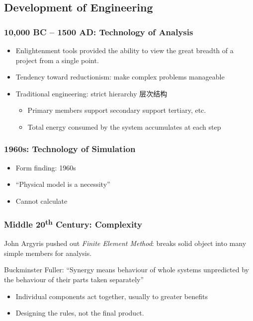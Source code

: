 \documentclass[a4paper, openany]{book}
\begin{document}
\subsection{Development of Engineering}

\subsubsection{10,000 BC -- 1500 AD: Technology of Analysis}

\begin{itemize}
  \item Enlightenment tools provided the ability to view the great breadth of a project from a single point.
  \item Tendency toward reductionism: make complex problems manageable
  \item Traditional engineering: strict hierarchy 层次结构
  \begin{itemize}
    \item Primary members support secondary support tertiary, etc.
    \item Total energy consumed by the system accumulates at each step
  \end{itemize}
\end{itemize}

\subsubsection{1960s: Technology of Simulation}

\begin{itemize}
  \item Form finding: 1960s
  \item ``Physical model is a necessity''
  \item Cannot calculate
\end{itemize}

\subsubsection{Middle 20\textsuperscript{th} Century: Complexity}

John Argyris pushed out \textit{Finite Element Method}: breaks solid object into many simple members for analysis.

Buckminster Fuller: ``Synergy means behaviour of whole systems
unpredicted by the behaviour of their parts taken separately''

\begin{itemize}
  \item Individual components act together, usually to greater benefits
  \item Designing the rules, not the final product.
\end{itemize}
\end{document}
